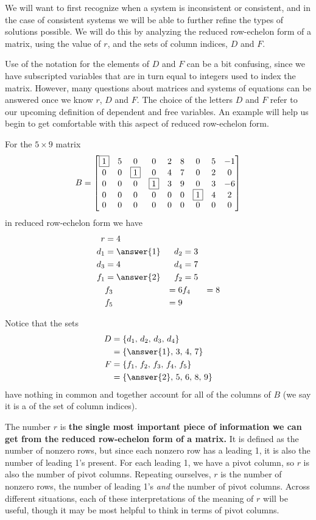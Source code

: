 \documentclass{ximera}
\begin{document}
We will want to first recognize when a system is inconsistent or
consistent, and in the case of consistent systems we will be able to
further refine the types of solutions possible.  We will do this by
analyzing the reduced row-echelon form of a matrix, using the value of
$r$, and the sets of column indices, $D$ and $F$.

Use of the notation for the elements of $D$ and $F$ can be a bit
confusing, since we have subscripted variables that are in turn equal
to integers used to index the matrix.  However, many questions about
matrices and systems of equations can be answered once we know $r$,
$D$ and $F$.  The choice of the letters $D$ and $F$ refer to our
upcoming definition of dependent and free variables.  An example will
help us begin to get comfortable with this aspect of reduced
row-echelon form.

\begin{example}
For the $5\times 9$ matrix
\[
B=
\begin{bmatrix}
\fbox{1}&5&0&0&2&8&0&5&-1\\
0&0&\fbox{1}&0&4&7&0&2&0\\
0&0&0&\fbox{1}&3&9&0&3&-6\\
0&0&0&0&0&0&\fbox{1}&4&2\\
0&0&0&0&0&0&0&0&0
\end{bmatrix}
\]
in reduced row-echelon form we have
\begin{align*}
r&=4\\
d_1&=\answer{1}
&
d_2&=3 \\
d_3&=4
&
d_4&=7\\
f_1&=\answer{2}
&
f_2&=5 \\
&
f_3&=6
&
f_4&=8\\
&
f_5&=9
\end{align*}

Notice that the sets
\begin{align*}
D&=\set{d_1,\,d_2,\,d_3,\,d_4}\\
  &=\set{\answer{1},\,3,\,4,\,7} \\
F&=\set{f_1,\,f_2,\,f_3,\,f_4,\,f_5}\\
  &=\set{\answer{2},\,5,\,6,\,8,\,9}
\end{align*}
have nothing in common and together account for all of the columns of $B$ (we say it is a  of the set of column indices).
\end{example}

The number $r$ is \textbf{the single most important piece of
  information we can get from the reduced row-echelon form of a
  matrix.}  It is defined as the number of nonzero rows, but since
each nonzero row has a leading 1, it is also the number of leading 1's
present.  For each leading 1, we have a pivot column, so $r$ is also
the number of pivot columns.  Repeating ourselves, $r$ is the number
of nonzero rows, the number of leading 1's \textit{and} the number of
pivot columns.  Across different situations, each of these
interpretations of the meaning of $r$ will be useful, though it may be
most helpful to think in terms of pivot columns.
\end{document}
